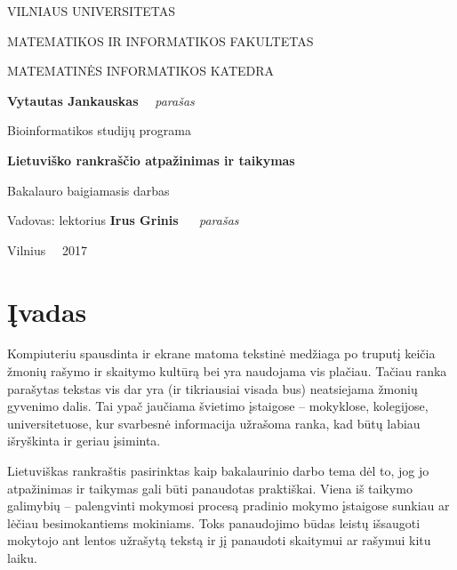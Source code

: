 \documentclass[a4paper,12pt]{article}
\begin{document}
\thispagestyle{empty} %

\begin{center}
 VILNIAUS UNIVERSITETAS 
 
MATEMATIKOS IR INFORMATIKOS FAKULTETAS

MATEMATINĖS INFORMATIKOS KATEDRA

\vspace{4cm}

\textbf{Vytautas Jankauskas} \ \ \textit{parašas}

Bioinformatikos studijų programa


\vspace{3cm}

\textbf{\Large Lietuviško rankraščio atpažinimas ir taikymas}

Bakalauro baigiamasis darbas 

\vspace{4cm}

Vadovas: lektorius \textbf{Irus Grinis} \ \   \textit{ parašas}

\vfill

Vilnius \ \  2017
\end{center}

\clearpage

\tableofcontents
\clearpage

\section*{Įvadas}
Kompiuteriu spausdinta ir ekrane matoma tekstinė medžiaga po truputį keičia žmonių rašymo ir skaitymo kultūrą bei yra naudojama vis plačiau. Tačiau ranka parašytas tekstas vis dar yra (ir tikriausiai visada bus) neatsiejama žmonių gyvenimo dalis. Tai ypač jaučiama švietimo įstaigose – mokyklose, kolegijose, universitetuose, kur svarbesnė informacija užrašoma ranka, kad būtų labiau išryškinta ir geriau įsiminta.

Lietuviškas rankraštis pasirinktas kaip bakalaurinio darbo tema dėl to, jog jo atpažinimas ir taikymas gali būti panaudotas praktiškai. Viena iš taikymo galimybių – palengvinti mokymosi procesą pradinio mokymo įstaigose sunkiau ar lėčiau besimokantiems mokiniams. Toks panaudojimo būdas leistų išsaugoti mokytojo ant lentos užrašytą tekstą ir jį panaudoti skaitymui ar rašymui kitu laiku.
\end{document}
